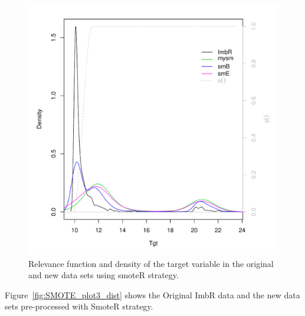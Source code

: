\documentclass[10pt,a4paper]{article}\usepackage[]{graphicx}\usepackage[]{color}
\makeatletter
\def\maxwidth{ %
  \ifdim\Gin@nat@width>\linewidth
    \linewidth
  \else
    \Gin@nat@width
  \fi
}
\newenvironment{knitrout}{}{} %
\makeatother
\begin{document}
\begin{knitrout}\footnotesize
{}\color{fgcolor}\begin{figure}

{\centering \includegraphics[width=\maxwidth]{figures/UBL-smoteR_plot1-1} 

}

\caption[Relevance function and density of the target variable in the original and new data sets using smoteR strategy]{Relevance function and density of the target variable in the original and new data sets using smoteR strategy.}\label{fig:smoteR_plot1}
\end{figure}


\end{knitrout}

Figure~\ref{fig:SMOTE_plot3_dist} shows the Original ImbR data and the new data sets pre-processed with SmoteR strategy.
\end{document}
